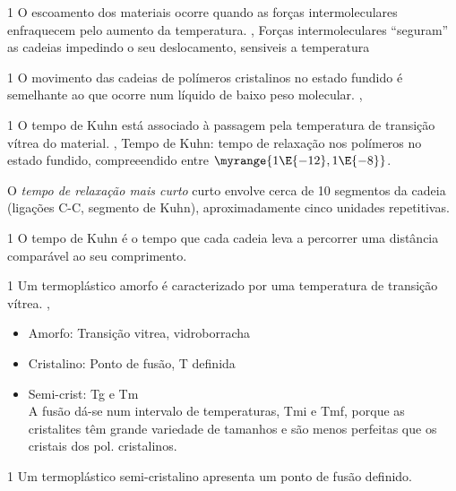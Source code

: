 \documentclass[\mainfilename]{subfiles}
\begin{document}
\begin{questionBox}1{ %
    O escoamento dos materiais ocorre quando as forças intermoleculares enfraquecem pelo aumento da temperatura.
} %
    \answer{}
    \AT{}, Forças intermoleculares “seguram” as cadeias impedindo o seu deslocamento, sensiveis a temperatura
\end{questionBox}
\begin{questionBox}1{ %
    O movimento das cadeias de polímeros cristalinos no estado fundido é semelhante ao que ocorre num líquido de baixo peso molecular.
} %
    \answer{}
    \AF{}, 
\end{questionBox}
\begin{questionBox}1{ %
    O tempo de Kuhn está associado à passagem pela temperatura de transição vítrea do material.
} %
    \answer{}
    \AT{}, Tempo de Kuhn: tempo de relaxação nos polímeros no estado fundido, compreeendido entre \(\myrange{1\E{-12},1\E{-8}}\).\par
    O \emph{tempo de relaxação mais curto} curto envolve cerca de 10 segmentos da cadeia (ligações C-C, segmento de Kuhn),
aproximadamente cinco unidades repetitivas.
\end{questionBox}
\begin{questionBox}1{ %
    O tempo de Kuhn é o tempo que cada cadeia leva a percorrer uma distância comparável ao seu comprimento.
} %
    \answer{}
    \AT{}
\end{questionBox}
\begin{questionBox}1{ %
    Um termoplástico amorfo é caracterizado por uma temperatura de transição vítrea.
} %
    \answer{}
    \AT{},
    \begin{itemize}
        \item Amorfo: Transição vitrea, vidro\to{}borracha
        \item Cristalino: Ponto de fusão, T definida
        \item Semi-crist: Tg e Tm\\
        A fusão dá-se num intervalo de
        temperaturas, Tmi e Tmf, porque as
        cristalites têm grande variedade de
        tamanhos e são menos perfeitas que
        os cristais dos pol. cristalinos.
    \end{itemize}
\end{questionBox}
\begin{questionBox}1{ %
    Um termoplástico semi-cristalino apresenta um ponto de fusão definido.
} %
    \AF
\end{questionBox}
\end{document}
